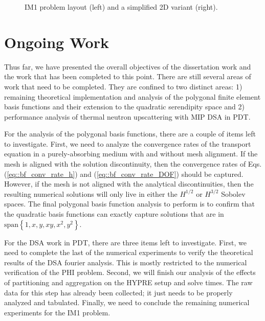 \documentclass[11pt]{article}
\begin{document}
\begin{figure}
\begin{subfigure}[b]{0.375\textwidth}
		\caption{}
		\label{fig::IM1_layouts_b}
	\end{subfigure}
\caption{IM1 problem layout (left) and a simplified 2D variant (right).}
\label{fig::IM1_layouts}
\end{figure}

\section{Ongoing Work}
\label{sec::OW}

Thus far, we have presented the overall objectives of the dissertation work and the work that has been completed to this point. There are still several areas of work that need to be completed. They are confined to two distinct areas: 1) remaining theoretical implementation and analysis of the polygonal finite element basis functions and their extension to the quadratic serendipity space and 2) performance analysis of thermal neutron upscattering with  MIP DSA in PDT.

For the analysis of the polygonal basis functions, there are a couple of items left to investigate. First, we need to analyze the convergence rates of the transport equation in a purely-absorbing medium with and without mesh alignment. If the mesh is aligned with the solution discontinuity, then the convergence rates of Eqs. (\ref{eq::bf_conv_rate_h}) and (\ref{eq::bf_conv_rate_DOF}) should be captured. However, if the mesh is not aligned with the analytical discontinuities, then the resulting numerical solutions will only live in either the $H^{1/2}$ or $H^{3/2}$ Sobolev spaces. The final polygonal basis function analysis to perform is to confirm that the quadratic basis functions can exactly capture solutions that are in $\text{span}\left\{  1,x,y,xy,x^2,y^2  \right\}$.

For the DSA work in PDT, there are three items left to investigate. First, we need to complete the last of the numerical experiments to verify the theoretical results of the DSA fourier analysis. This is mostly restricted to the numerical verification of the PHI problem. Second, we will finish our analysis of the effects of partitioning and aggregation on the HYPRE setup and solve times. The raw data for this step has already been collected; it just needs to be properly analyzed and tabulated. Finally, we need to conclude the remaining numerical experiments for the IM1 problem.
\end{document}
